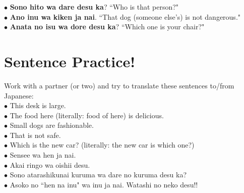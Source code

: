 \documentclass[11pt]{article} %
\newcommand{\ee}{\vspace{.10cm}\\} %
\begin{document}
$\bullet$ \textbf{Sono hito wa dare desu ka}?  ``Who is that person?"\ee

$\bullet$ \textbf{Ano inu wa kiken ja nai}.  ``That dog (someone else's) is not dangerous."\ee

$\bullet$ \textbf{Anata no isu wa dore desu ka}?  ``Which one is your chair?"\\


\section{Sentence Practice!}

Work with a partner (or two) and try to translate these sentences to/from Japanese:\ee

$\bullet$ This desk is large.\\
$\bullet$ The food here (literally: food of here) is delicious.\\
$\bullet$ Small dogs are fashionable.\\
$\bullet$ That is not safe.\\
$\bullet$ Which is the new car? (literally: the new car is which one?)\ee

$\bullet$ Sensee wa hen ja nai.\\
$\bullet$ Akai ringo wa oishii desu.\\
$\bullet$ Sono atarashikunai kuruma wa dare no kuruma desu ka?\\
$\bullet$ Asoko no ``hen na inu" wa inu ja nai.  Watashi no neko desu!! 
\end{document}
